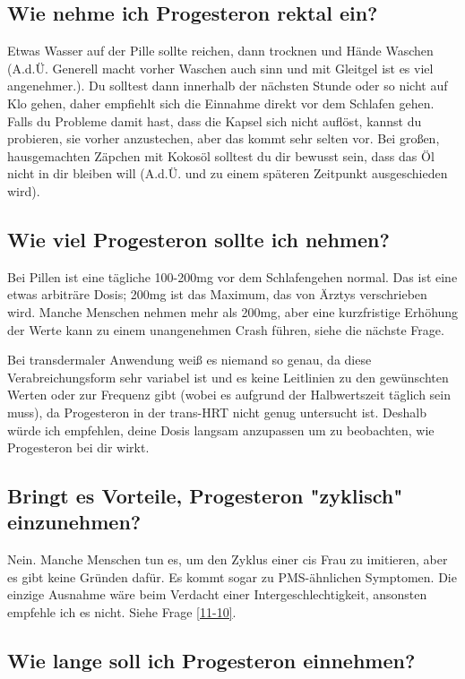 \documentclass{article}
\begin{document}
\subsection{Wie nehme ich Progesteron rektal ein?}

Etwas Wasser auf der Pille sollte reichen, dann trocknen und Hände Waschen (A.d.Ü. Generell macht vorher Waschen auch sinn und mit Gleitgel ist es viel angenehmer.). Du solltest dann innerhalb der nächsten Stunde oder so nicht auf Klo gehen, daher empfiehlt sich die Einnahme direkt vor dem Schlafen gehen. Falls du Probleme damit hast, dass die Kapsel sich nicht auflöst, kannst du probieren, sie vorher anzustechen, aber das kommt sehr selten vor. Bei großen, hausgemachten Zäpchen mit Kokosöl solltest du dir bewusst sein, dass das Öl nicht in dir bleiben will (A.d.Ü. und zu einem späteren Zeitpunkt ausgeschieden wird).

\subsection{Wie viel Progesteron sollte ich nehmen?}

Bei Pillen ist eine tägliche 100-200mg vor dem Schlafengehen normal. Das ist eine etwas arbiträre Dosis; 200mg ist das Maximum, das von Ärztys verschrieben wird. Manche Menschen nehmen mehr als 200mg, aber eine kurzfristige Erhöhung der Werte kann zu einem unangenehmen Crash führen, siehe die nächste Frage.

Bei transdermaler Anwendung weiß es niemand so genau, da diese Verabreichungsform sehr variabel ist und es keine Leitlinien zu den gewünschten Werten oder zur Frequenz gibt (wobei es aufgrund der Halbwertszeit täglich sein muss), da Progesteron in der trans-HRT nicht genug untersucht ist. Deshalb würde ich empfehlen, deine Dosis langsam anzupassen um zu beobachten, wie Progesteron bei dir wirkt.

\subsection{Bringt es Vorteile, Progesteron "zyklisch" einzunehmen?}\label{8-11}

Nein. Manche Menschen tun es, um den Zyklus einer cis Frau zu imitieren, aber es gibt keine Gründen dafür. Es kommt sogar zu PMS-ähnlichen Symptomen. Die einzige Ausnahme wäre beim Verdacht einer Intergeschlechtigkeit, ansonsten empfehle ich es nicht. Siehe Frage \ref{11-10}.

\subsection{Wie lange soll ich Progesteron einnehmen?}
\end{document}
